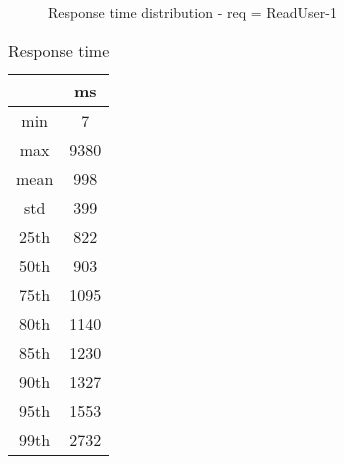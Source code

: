 \begin{minipage}{0.75\linewidth}
\begin{figure}[h]
\begin{adjustbox}{max width=1.0\linewidth, keepaspectratio}
  \end{adjustbox}
  \caption{Response time distribution - req = ReadUser-1}
\end{figure}
\end{minipage}\hfill\begin{minipage}{0.18\linewidth}
\begin{table}[h]
\begin{tabular}{|cc|}
\hline
\textbf{} & \textbf{ms}\\ \hline
 \Xhline{0.005\arrayrulewidth}
min & 7\\
 \Xhline{0.005\arrayrulewidth}
max & 9380\\
 \Xhline{0.005\arrayrulewidth}
mean & 998\\
 \Xhline{0.005\arrayrulewidth}
std & 399\\
\hline
\hline
 \Xhline{0.005\arrayrulewidth}
25th & 822\\
 \Xhline{0.005\arrayrulewidth}
50th & 903\\
 \Xhline{0.005\arrayrulewidth}
75th & 1095\\
 \Xhline{0.005\arrayrulewidth}
80th & 1140\\
 \Xhline{0.005\arrayrulewidth}
85th & 1230\\
 \Xhline{0.005\arrayrulewidth}
90th & 1327\\
 \Xhline{0.005\arrayrulewidth}
95th & 1553\\
 \Xhline{0.005\arrayrulewidth}
99th & 2732\\
\hline
\end{tabular}
\caption{Response time}
\end{table}
\end{minipage}\hfill